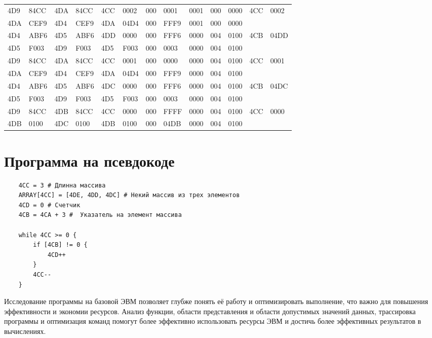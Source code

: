 \documentclass[14pt]{extreport}
\begin{document}
\begin{landscape}
\begin{table}[!h]
\begin{tabular}{|l|l|l|l|l|l|l|l|l|l|l|l|l|}
                    4D9 & 84CC & 4DA & 84CC & 4CC & 0002 & 000 & 0001 & 0001 & 000 & 0000 & 4CC & 0002 \\
                    4DA & CEF9 & 4D4 & CEF9 & 4DA & 04D4 & 000 & FFF9 & 0001 & 000 & 0000 &&\\
                    4D4 & ABF6 & 4D5 & ABF6 & 4DD & 0000 & 000 & FFF6 & 0000 & 004 & 0100 & 4CB & 04DD \\
                    4D5 & F003 & 4D9 & F003 & 4D5 & F003 & 000 & 0003 & 0000 & 004 & 0100 &&\\
                    4D9 & 84CC & 4DA & 84CC & 4CC & 0001 & 000 & 0000 & 0000 & 004 & 0100 & 4CC & 0001 \\
                    4DA & CEF9 & 4D4 & CEF9 & 4DA & 04D4 & 000 & FFF9 & 0000 & 004 & 0100 &&\\
                    4D4 & ABF6 & 4D5 & ABF6 & 4DC & 0000 & 000 & FFF6 & 0000 & 004 & 0100 & 4CB & 04DC \\
                    4D5 & F003 & 4D9 & F003 & 4D5 & F003 & 000 & 0003 & 0000 & 004 & 0100 &&\\
                    4D9 & 84CC & 4DB & 84CC & 4CC & 0000 & 000 & FFFF & 0000 & 004 & 0100 & 4CC & 0000 \\
                    4DB & 0100 & 4DC & 0100 & 4DB & 0100 & 000 & 04DB & 0000 & 004 & 0100 &&\\
                    \hline
                \end{tabular}
            \end{table}
        \end{landscape}

    \chapter{Программа на псевдокоде}
        \begin{verbatim}
    4CC = 3 # Длинна массива
    ARRAY[4CC] = [4DE, 4DD, 4DC] # Некий массив из трех элементов
    4CD = 0 # Счетчик
    4CB = 4CA + 3 #  Указатель на элемент массива

    while 4CC >= 0 {
        if [4CB] != 0 {
            4CD++
        }
        4CC--
    }
        \end{verbatim}
    \conclusions Исследование программы на базовой ЭВМ позволяет глубже понять её работу и оптимизировать выполнение, что важно для повышения эффективности и экономии ресурсов. Анализ функции, области представления и области допустимых значений данных, трассировка программы и оптимизация команд помогут более эффективно использовать ресурсы ЭВМ и достичь более эффективных результатов в вычислениях.
\end{document}

